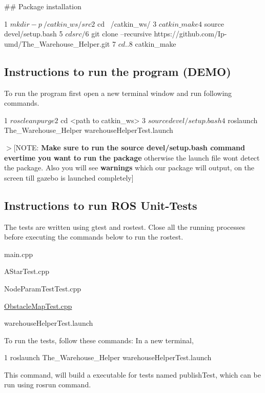 \#\# Package installation 
\begin{DoxyCode}
1 $ mkdir -p ~/catkin\_ws/src
2 $ cd ~/catkin\_ws/
3 $ catkin\_make
4 $ source devel/setup.bash
5 $ cd src/
6 $ git clone --recursive https://github.com/Ip-umd/The\_Warehouse\_Helper.git
7 $ cd ..
8 $ catkin\_make
\end{DoxyCode}
 \subsection*{Instructions to run the program (D\+E\+MO)}

To run the program first open a new terminal window and run following commands. 
\begin{DoxyCode}
1 $ rosclean purge
2 $ cd <path to catkin\_ws>
3 $ source devel/setup.bash
4 $ roslaunch The\_Warehouse\_Helper warehouseHelperTest.launch
\end{DoxyCode}
 $>$\mbox{[}N\+O\+TE\+: {\bfseries Make sure to run the source devel/setup.\+bash command evertime you want to run the package} otherwise the launch file won\textquotesingle{}t detect the package. Also you will see {\bfseries warnings} which our package will output, on the screen till gazebo is launched completely\mbox{]}

\subsection*{Instructions to run R\+OS Unit-\/\+Tests}

The tests are written using gtest and rostest. Close all the running processes before executing the commands below to run the rostest.


\begin{DoxyItemize}
\item main.\+cpp
\item A\+Star\+Test.\+cpp
\item Node\+Param\+Test\+Test.\+cpp
\item \hyperlink{_obstacle_map_test_8cpp}{Obstacle\+Map\+Test.\+cpp}
\item warehouse\+Helper\+Test.\+launch
\end{DoxyItemize}

To run the tests, follow these commands\+: In a new terminal, 
\begin{DoxyCode}
1 roslaunch The\_Warehouse\_Helper warehouseHelperTest.launch
\end{DoxyCode}
 This command, will build a executable for tests named publish\+Test, which can be run using rosrun command.

